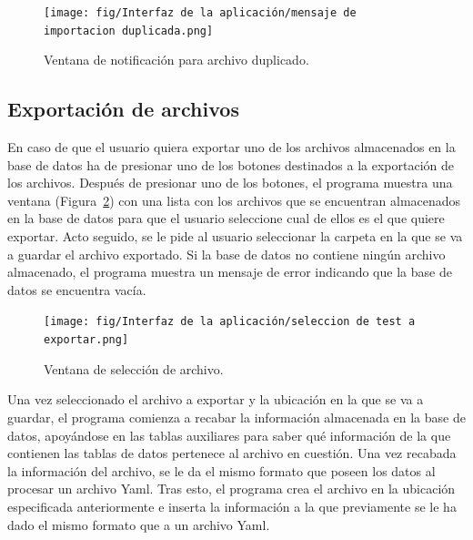 \begin{figure}[H]
    \centering
    \texttt{[image: fig/Interfaz de la aplicación/mensaje de importacion duplicada.png]}
    \caption{Ventana de notificación para archivo duplicado.}
    \label{fig:importFailedDueDuplicatedFile}
\end{figure}

\subsection{Exportación de archivos}
\label{PruebasExportacionArchivos}

En caso de que el usuario quiera exportar uno de los archivos almacenados en la base de datos ha de presionar uno de los botones destinados a la exportación de los archivos. Después de presionar uno de los botones, el programa muestra una ventana (Figura~\ref{fig:fileSelectorWindow}) con una lista con los archivos que se encuentran almacenados en la base de datos para que el usuario seleccione cual de ellos es el que quiere exportar. Acto seguido, se le pide al usuario seleccionar la carpeta en la que se va a guardar el archivo exportado. Si la base de datos no contiene ningún archivo almacenado, el programa muestra un mensaje de error indicando que la base de datos se encuentra vacía.


\begin{figure}[H]
    \centering
    \texttt{[image: fig/Interfaz de la aplicación/seleccion de test a exportar.png]}
    \caption{Ventana de selección de archivo.}
    \label{fig:fileSelectorWindow}
\end{figure}

Una vez seleccionado el archivo a exportar y la ubicación en la que se va a guardar, el programa comienza a recabar la información almacenada en la base de datos, apoyándose en las tablas auxiliares para saber qué información de la que contienen las tablas de datos pertenece al archivo en cuestión. Una vez recabada la información del archivo, se le da el mismo formato que poseen los datos al procesar un archivo \acrshort{Yaml}. Tras esto, el programa crea el archivo en la ubicación especificada anteriormente e inserta la información a la que previamente se le ha dado el mismo formato que a un archivo \acrshort{Yaml}.


